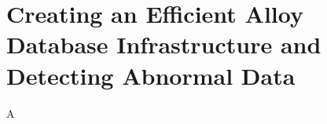 \chapter{Creating an Efficient Alloy Database Infrastructure and Detecting Abnormal Data} \label{chap:ultera}

A

\printbibliography[heading=subbibintoc]